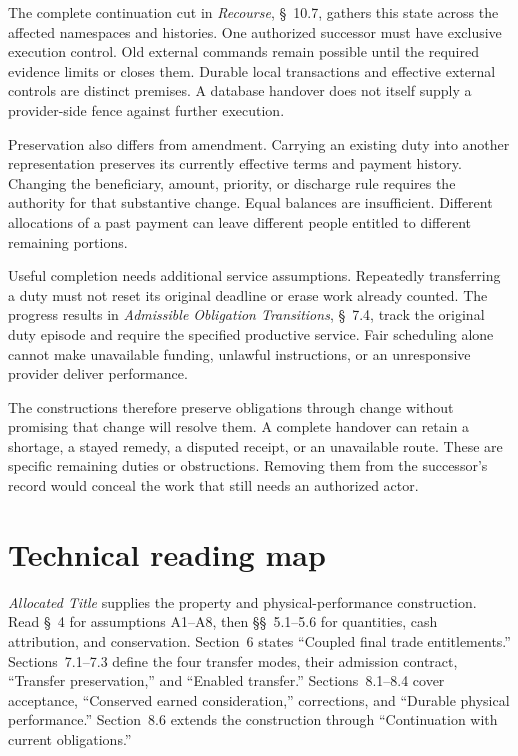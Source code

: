 \documentclass{momentum}
\begin{document}
The complete continuation cut in \emph{Recourse}, \S~10.7, gathers this state across the affected namespaces and histories. One authorized successor must have exclusive execution control. Old external commands remain possible until the required evidence limits or closes them. Durable local transactions and effective external controls are distinct premises. A database handover does not itself supply a provider-side fence against further execution.

Preservation also differs from amendment. Carrying an existing duty into another representation preserves its currently effective terms and payment history. Changing the beneficiary, amount, priority, or discharge rule requires the authority for that substantive change. Equal balances are insufficient. Different allocations of a past payment can leave different people entitled to different remaining portions.

Useful completion needs additional service assumptions. Repeatedly transferring a duty must not reset its original deadline or erase work already counted. The progress results in \emph{Admissible Obligation Transitions}, \S~7.4, track the original duty episode and require the specified productive service. Fair scheduling alone cannot make unavailable funding, unlawful instructions, or an unresponsive provider deliver performance.

The constructions therefore preserve obligations through change without promising that change will resolve them. A complete handover can retain a shortage, a stayed remedy, a disputed receipt, or an unavailable route. These are specific remaining duties or obstructions. Removing them from the successor's record would conceal the work that still needs an authorized actor.

\section{Technical reading map}

\emph{Allocated Title} supplies the property and physical-performance construction. Read \S~4 for assumptions A1--A8, then \S\S~5.1--5.6 for quantities, cash attribution, and conservation. Section~6 states ``Coupled final trade entitlements.'' Sections~7.1--7.3 define the four transfer modes, their admission contract, ``Transfer preservation,'' and ``Enabled transfer.'' Sections~8.1--8.4 cover acceptance, ``Conserved earned consideration,'' corrections, and ``Durable physical performance.'' Section~8.6 extends the construction through ``Continuation with current obligations.''
\end{document}
